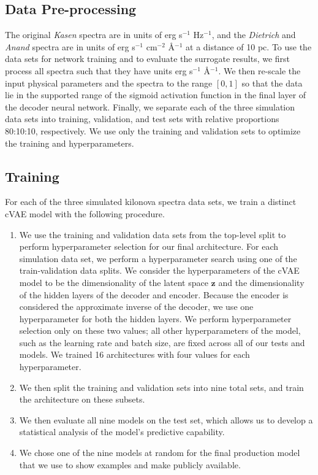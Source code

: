 \documentclass[fleqn,usenatbib,useAMS]{mnras}
\begin{document}
\subsection{Data Pre-processing}
\label{sec:datapreproc}
The original \emph{Kasen} spectra are in units of erg s$^{-1}$ Hz$^{-1}$, and the \emph{Dietrich} and \emph{Anand} spectra are in units of erg s$^{-1}$ cm$^{-2}$ \AA$^{-1}$ at a distance of 10 pc. 
To use the data sets for network training and to evaluate the surrogate results, we first process all spectra such that they have units erg s$^{-1}$ \AA$^{-1}$.
We then re-scale the input physical parameters and the spectra to the range $[0,1]$ so that the data lie in the supported range of the sigmoid activation function in the final layer of the decoder neural network. 
Finally, we separate each of the three simulation data sets into training, validation, and test sets with relative proportions 80:10:10, respectively.
We use only the training and validation sets to optimize the training and hyperparameters.




\subsection{Training}
\label{sec:training}

For each of the three simulated kilonova spectra data sets, we train a distinct cVAE model with the following procedure. 
\begin{enumerate}
    \item We use the training and validation data sets from the top-level split to perform hyperparameter selection for our final architecture. 
    For each simulation data set, we perform a hyperparameter search using one of the train-validation data splits.
    We consider the hyperparameters of the cVAE model to be the dimensionality of the latent space $\mathbf{z}$ and the dimensionality of the hidden layers of the decoder and encoder.
    Because the encoder is considered the approximate inverse of the decoder, we use one hyperparameter for both the hidden layers.
    We perform hyperparameter selection only on these two values; all other hyperparameters of the model, such as the learning rate and batch size, are fixed across all of our tests and models. 
    We trained 16 architectures with four values for each hyperparameter.
    \item We then split the training and validation sets into nine total sets, and train the architecture on these subsets. 
    \item We then evaluate all nine models on the test set, which allows us to develop a statistical analysis of the model's predictive capability.
    \item We chose one of the nine models at random for the final production model that we use to show examples and make publicly available. 
\end{enumerate}
\end{document}
